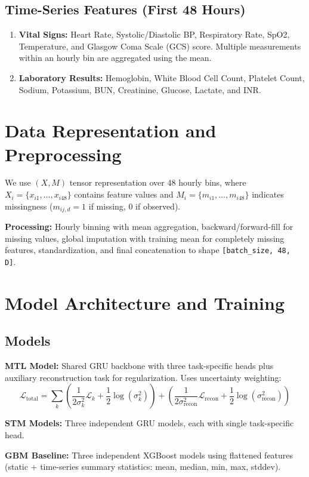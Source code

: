 \documentclass[11pt, a4paper]{article}
\begin{document}
\subsection{Time-Series Features (First 48 Hours)}
\begin{enumerate}
    \item \textbf{Vital Signs:} Heart Rate, Systolic/Diastolic BP, Respiratory Rate, SpO2, Temperature, and Glasgow Coma Scale (GCS) score. Multiple measurements within an hourly bin are aggregated using the mean.
    \item \textbf{Laboratory Results:} Hemoglobin, White Blood Cell Count, Platelet Count, Sodium, Potassium, BUN, Creatinine, Glucose, Lactate, and INR.
\end{enumerate}

\section{Data Representation and Preprocessing}
We use $(X, M)$ tensor representation over 48 hourly bins, where $X_i = \{x_{i1}, \ldots, x_{i48}\}$ contains feature values and $M_i = \{m_{i1}, \ldots, m_{i48}\}$ indicates missingness ($m_{ij,d} = 1$ if missing, 0 if observed).

\textbf{Processing:} Hourly binning with mean aggregation, backward/forward-fill for missing values, global imputation with training mean for completely missing features, standardization, and final concatenation to shape \texttt{[batch\_size, 48, D]}.

\section{Model Architecture and Training}

\subsection{Models}
\textbf{MTL Model:} Shared GRU backbone with three task-specific heads plus auxiliary reconstruction task for regularization. Uses uncertainty weighting:
\[ \mathcal{L}_{\text{total}} = \sum_{k} \left( \frac{1}{2\sigma_k^2} \mathcal{L}_k + \frac{1}{2}\log(\sigma_k^2) \right) + \left( \frac{1}{2\sigma_{\text{recon}}^2} \mathcal{L}_{\text{recon}} + \frac{1}{2}\log(\sigma_{\text{recon}}^2) \right) \]

\textbf{STM Models:} Three independent GRU models, each with single task-specific head.

\textbf{GBM Baseline:} Three independent XGBoost models using flattened features (static + time-series summary statistics: mean, median, min, max, stddev).
\end{document}
